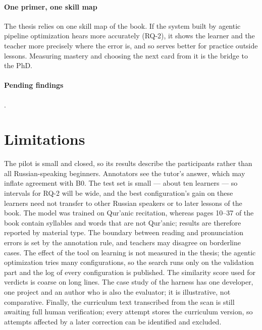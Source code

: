 \paragraph{One primer, one skill map} The thesis relies on one skill map of the book. If the system built by agentic pipeline optimization hears more accurately (RQ-2), it shows the learner and the teacher more precisely where the error is, and so serves better for practice outside lessons. Measuring mastery and choosing the next card from it is the bridge to the PhD.

\paragraph{Pending findings} .

\section{Limitations}\label{sec:eval-limits}

The pilot is small and closed, so its results describe the participants rather than all Russian-speaking
beginners. Annotators see the tutor's answer, which may inflate agreement with B0. The test set is small --- about ten learners --- so intervals for RQ-2 will
be wide, and the best configuration's gain on these learners need not transfer to other Russian speakers or to
later lessons of the book. The model was trained on Qur'anic
recitation, whereas pages 10--37 of the book contain syllables and words that are not Qur'anic; results are
therefore reported by material type. The boundary between reading and pronunciation errors is set by the
annotation rule, and teachers may disagree on borderline cases. The effect of the tool on learning is not measured in the thesis; the agentic optimization tries many configurations, so the search runs only on the validation part and the log of every configuration is published. The similarity score used for verdicts is coarse on long lines. The
case study of the harness has one developer, one project and an author who is also the evaluator; it is
illustrative, not comparative. Finally, the curriculum text transcribed from the scan is still awaiting full
human verification; every attempt stores the curriculum version, so attempts affected by a later correction
can be identified and excluded.
